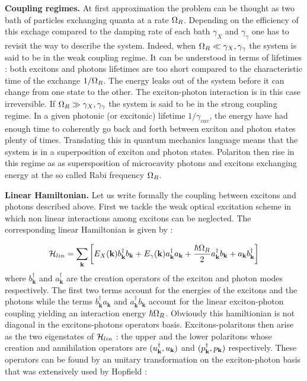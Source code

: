 \bigskip
\noindent \textbf{Coupling regimes.} At first approximation the problem can be thought as two bath of particles 
exchanging quanta at a rate $\Omega_R$. Depending on the efficiency of this exchage compared to
the damping rate of each bath $\gamma_X$ and $\gamma_{\gamma}$ one has to revisit the way to describe the system. Indeed, when 
$\Omega_R \ll \gamma_X, \gamma_{\gamma}$ the system is said to be in the weak coupling regime. It can be understood in terms of lifetimes : both excitons and photons lifetimes are too short compared to the 
characteristic time of the exchange $1/\Omega_R$. The energy leaks out of the system before it can change from one state to the other. The exciton-photon interaction is in this case irreversible.
If $\Omega_R \gg \gamma_X, \gamma_{\gamma}$ the system is said to be in the strong coupling regime. In a given photonic (or excitonic) lifetime $1/\gamma_{cav}$,
 the energy have had enough time to coherently go back and forth between exciton and photon states plenty of times. Translating
this in quantum mechanics language means that the system is in a superposition of exciton and photon states. Polariton then rise in this regime as
as supersposition of microcavity photons and excitons exchanging energy at the so called Rabi frequency $\Omega_R$. 

\bigskip

\textbf{Linear Hamiltonian.} Let us write formally the coupling between excitons and photons described above. First we tackle
the weak optical excitation scheme in which non linear interactions among excitons can be neglected. The corresponding linear Hamiltonian 
is given by : 

\begin{equation}
    \mathcal{H}_{lin} = \sum_{\mathbf{k}}\left[E_X(\mathbf{k})b^{\dagger}_{\mathbf{k}}b_{\mathbf{k}} + E_{\gamma}(\mathbf{k})a^{\dagger}_{\mathbf{k}}a_{\mathbf{k}} + \dfrac{\hbar\Omega_R}{2}a^{\dagger}_{\mathbf{k}}b_{\mathbf{k}} + a_{\mathbf{k}}b^{\dagger}_{\mathbf{k}}\right]
    \label{eq:linear_hamiltonian}
\end{equation}
where $b^{\dagger}_{\mathbf{k}}$ and $a^{\dagger}_{\mathbf{k}}$ are the creation operators of the exciton and photon modes respectively. The first two terms account for the energies of the excitons and the photons while 
the terms $b^{\dagger}_{\mathbf{k}}a_{\mathbf{k}}$ and $a^{\dagger}_{\mathbf{k}}b_{\mathbf{k}}$ account for the linear exciton-photon coupling yielding an interaction energy $\hbar\Omega_R$. 
Obviously this hamiltionian is not diagonal in the excitons-photons operators basis.
Excitons-polaritons then arise as the two eigenstates of $\mathcal{H}_{lin}$ : the upper and the lower polaritons whose creation and annihilation operators are  $(u_{\mathbf{k}}^{\dagger}, u_{\mathbf{k}})$ and $(p_{\mathbf{k}}^{\dagger}, p_{\mathbf{k}})$ respectively.
These operators can be found by an unitary transformation on the exciton-photon basis that was extensively used by Hopfield \cite{hopfield_theory_1958} :


